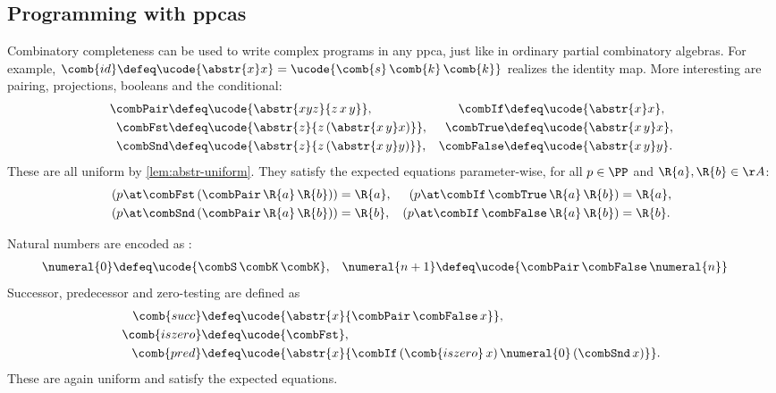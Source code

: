 \subsection{Programming with ppcas}
\label{sec:progr-with-ppcas}

Combinatory completeness can be used to write complex programs in any ppca, just like in ordinary partial combinatory algebras. For example, $\comb{id} \defeq \ucode{\abstr{x} x} = \ucode{\comb{s} \, \comb{k} \, \comb{k}}$ realizes the identity map.
%
More interesting are pairing, projections, booleans and the conditional:
%
\begin{align*}
  \combPair &\defeq \ucode{\abstr{x y z}{z\, x\, y}},
  &
  \combIf &\defeq \ucode{\abstr{x} x},
  \\
  \combFst &\defeq \ucode{\abstr{z}{z \, (\abstr{x\,y} x)}},
  &
  \combTrue &\defeq \ucode{\abstr{x\,y} x},
  \\
  \combSnd &\defeq \ucode{\abstr{z}{z \, (\abstr{x\,y} y)}},
  &
  \combFalse &\defeq \ucode{\abstr{x\,y} y}.
\end{align*}
%
These are all uniform by \cref{lem:abstr-uniform}. They satisfy the expected equations parameter-wise, for all $p \in \PP$ and $\R{a}, \R{b} \in \AA$:
%
\begin{align*}
  (p \at \combFst \, (\combPair \, \R{a} \, \R{b})) &= \R{a}, &
  (p \at \combIf \, \combTrue \, \R{a} \, \R{b}) &= \R{a}, \\
  (p \at \combSnd \, (\combPair \, \R{a} \, \R{b})) &= \R{b}, &
  (p \at \combIf \, \combFalse \, \R{a} \, \R{b}) &= \R{b}.
\end{align*}

Natural numbers are encoded as :
%
\begin{align*}
  \numeral{0} &\defeq \ucode{\combS\, \combK\, \combK},
  &
  \numeral{n+1} &\defeq \ucode{\combPair \, \combFalse \, \numeral{n}}
\end{align*}
%
Successor, predecessor and zero-testing are defined as
%
\begin{align}
  \comb{succ} &\defeq \ucode{\abstr{x}{\combPair \, \combFalse \,x}}, \label{eq:comb-succ} \\ 
  \comb{iszero} &\defeq \ucode{\combFst}, \notag\\
  \comb{pred} &\defeq
  \ucode{\abstr{x}{\combIf\, (\comb{iszero}\, x)\, \numeral{0}\, (\combSnd\, x)}}. \notag
\end{align}
%
These are again uniform and satisfy the expected equations.

